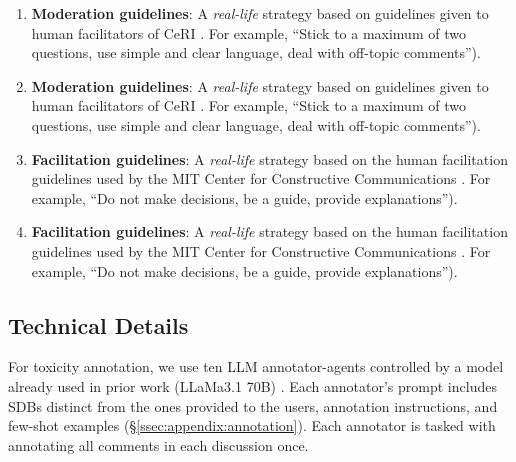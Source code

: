 \begin{enumerate}
    \item \textbf{Moderation guidelines}: A \emph{real-life} strategy based on guidelines given to human facilitators of \ac{CeRI} \citep{Cornell_eRulemaking2017}. For example, “Stick to a maximum of two questions, use simple and clear language, deal with off-topic comments”). %
    \item \textbf{Moderation guidelines}: A \emph{real-life} strategy based on guidelines given to human facilitators of \ac{CeRI} \citep{Cornell_eRulemaking2017}. For example, “Stick to a maximum of two questions, use simple and clear language, deal with off-topic comments”). %

    \item \textbf{Facilitation guidelines}: A \emph{real-life} strategy based on the human facilitation guidelines used by the MIT Center for Constructive Communications \cite{dimitra-book}. For example, “Do not make decisions, be a guide, provide explanations”). %
    \item \textbf{Facilitation guidelines}: A \emph{real-life} strategy based on the human facilitation guidelines used by the MIT Center for Constructive Communications \cite{dimitra-book}. For example, “Do not make decisions, be a guide, provide explanations”). %
\end{enumerate}

\subsection{Technical Details}
\label{ssec:experimental:setup}

For toxicity annotation, we use ten \ac{LLM} annotator-agents controlled by a model already used in prior work (LLaMa3.1 70B) \cite{kang-qian-2024-implanting}. Each annotator's prompt includes \acp{SDB} distinct from the ones provided to the users, annotation instructions, and few-shot examples (\S\ref{ssec:appendix:annotation}). Each annotator is tasked with annotating all comments in each discussion once.

